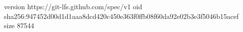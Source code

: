 version https://git-lfs.github.com/spec/v1
oid sha256:947452d00d1d1aaa8dcd420c450e363f0ffb08f60da92e02b3e3f5046b15acef
size 87544
